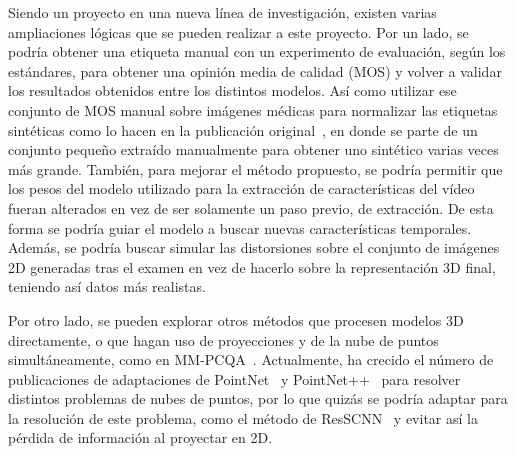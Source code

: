 Siendo un proyecto en una nueva línea de investigación, existen varias ampliaciones 
lógicas que se pueden realizar a este proyecto. Por un lado, se podría 
obtener una etiqueta manual con un experimento de evaluación, según los estándares, para 
obtener una opinión media de calidad (MOS) y volver a validar los resultados obtenidos
entre los distintos modelos. Así como utilizar ese conjunto de MOS manual sobre imágenes médicas 
para normalizar las etiquetas sintéticas como lo hacen en la publicación original~\cite{ResSCNN}, 
en donde se parte de un conjunto pequeño extraído manualmente para obtener uno sintético varias 
veces más grande. También, para mejorar el método propuesto, se podría permitir 
que los pesos del modelo utilizado para la extracción de características 
del vídeo fueran alterados en vez de ser solamente un paso previo, de extracción. 
De esta forma se podría guiar el modelo a buscar nuevas características temporales.  
Además, se podría buscar simular las distorsiones 
sobre el conjunto de imágenes 2D generadas tras el examen en vez de hacerlo 
sobre la representación 3D final, teniendo así datos más realistas. 

Por otro lado, se pueden explorar otros métodos que procesen modelos 3D directamente, 
o que hagan uso de proyecciones y de la nube de puntos simultáneamente, como en MM-PCQA~\cite{MM-PCQA}.
Actualmente, ha crecido el número de publicaciones de adaptaciones de PointNet~\cite{PointNet} y 
PointNet++~\cite{PointNet++} para resolver distintos problemas de nubes de puntos, 
por lo que quizás se podría adaptar para la resolución de este problema, como 
el método de ResSCNN~\cite{ResSCNN} y evitar así 
la pérdida de información al proyectar en 2D.
